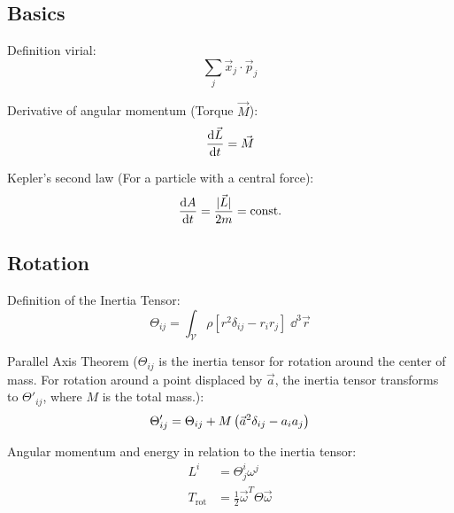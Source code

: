 	\subsection{Basics}
		\noindent
		Definition virial:
		\begin{equation}
			\sum_j \vec{x}_j\cdot\vec{p}_j
		\end{equation}

		\noindent
		Derivative of angular momentum (Torque $\vec{M}$):
		\begin{equation}
			\frac{\dd \vec{L}}{\dd t} = \vec{M}
		\end{equation}

		\noindent
		Kepler's second law (For a particle with a central force):%
		\begin{equation}
			\frac{\dd A}{\dd t} = \frac{| \vec{L} |}{2 m} = \mathrm{const.}
		\end{equation}

	\subsection{Rotation}
		\noindent
		Definition of the Inertia Tensor:
		\begin{equation}
			\Theta_{ij}=\int_{\mathcal{V}} \rho \left[r^2\delta_{ij}-r_i r_j\right] \;\dd^3\vec{r}
		\end{equation}

		\noindent
		Parallel Axis Theorem ($\Theta_{ij}$ is the inertia tensor for rotation around the center of mass.
		For rotation around a point displaced by $\vec{a}$, the inertia tensor transforms to $\Theta'_{ij}$, where $M$ is the total mass.):%
		\begin{equation}
			\Theta'_{ij} = \Theta_{ij} + M\left( \vec{a}^2\delta_{ij} - a_i a_j \right)
		\end{equation}

		\noindent
		Angular momentum and energy in relation to the inertia tensor:%
		\begin{equation}
			\begin{aligned}
				L^i &= \Theta^i_j \omega^j \\
				T_{\mathrm{rot}} &= \frac{1}{2}\vec{\omega}^T \Theta \vec{\omega}
			\end{aligned}
		\end{equation}

